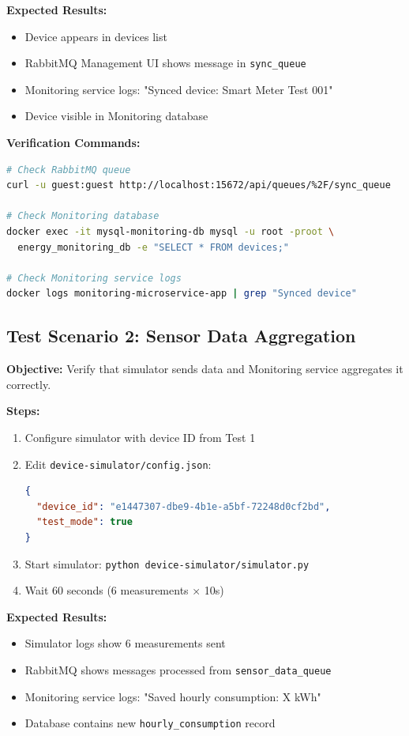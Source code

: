 \documentclass[12pt,a4paper]{article}
\begin{document}
\textbf{Expected Results:}
\begin{itemize}
    \item Device appears in devices list
    \item RabbitMQ Management UI shows message in \texttt{sync\_queue}
    \item Monitoring service logs: "Synced device: Smart Meter Test 001"
    \item Device visible in Monitoring database
\end{itemize}

\textbf{Verification Commands:}
\begin{lstlisting}[language=bash]
# Check RabbitMQ queue
curl -u guest:guest http://localhost:15672/api/queues/%2F/sync_queue

# Check Monitoring database
docker exec -it mysql-monitoring-db mysql -u root -proot \
  energy_monitoring_db -e "SELECT * FROM devices;"

# Check Monitoring service logs
docker logs monitoring-microservice-app | grep "Synced device"
\end{lstlisting}

\subsection{Test Scenario 2: Sensor Data Aggregation}

\textbf{Objective:} Verify that simulator sends data and Monitoring service aggregates it correctly.

\textbf{Steps:}
\begin{enumerate}
    \item Configure simulator with device ID from Test 1
    \item Edit \texttt{device-simulator/config.json}:
\begin{lstlisting}[language=json]
{
  "device_id": "e1447307-dbe9-4b1e-a5bf-72248d0cf2bd",
  "test_mode": true
}
\end{lstlisting}
    \item Start simulator: \texttt{python device-simulator/simulator.py}
    \item Wait 60 seconds (6 measurements × 10s)
\end{enumerate}

\textbf{Expected Results:}
\begin{itemize}
    \item Simulator logs show 6 measurements sent
    \item RabbitMQ shows messages processed from \texttt{sensor\_data\_queue}
    \item Monitoring service logs: "Saved hourly consumption: X kWh"
    \item Database contains new \texttt{hourly\_consumption} record
\end{itemize}
\end{document}

